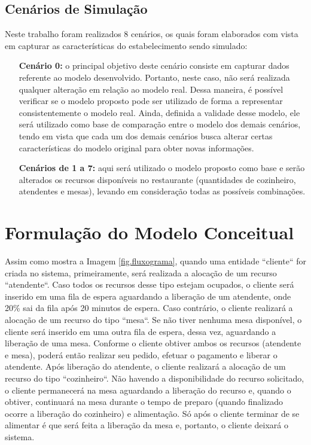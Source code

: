 \documentclass[pt,disc,oneside]{ufscpgeasthesis}
\begin{document}
            \subsection{Cenários de Simulação}
            \label{subsec:cenarios}

                Neste trabalho foram realizados 8 cenários, os quais foram elaborados com vista em capturar as características do estabelecimento sendo simulado:

                \begin{itemize}
                    \item[\textbf{Cenário 0:}] o principal objetivo deste cenário consiste em capturar dados referente ao modelo desenvolvido.
                    Portanto, neste caso, não será realizada qualquer alteração em relação ao modelo real.
                    Dessa maneira, é possível verificar se o modelo proposto pode ser utilizado de forma a representar consistentemente o modelo real.
                    Ainda, definida a validade desse modelo, ele será utilizado como base de comparação entre o modelo dos demais cenários, tendo em vista que cada um dos demais cenários busca alterar certas características do modelo original para obter novas informações.
                    \item[\textbf{Cenários de 1 a 7:}] aqui será utilizado o modelo proposto como base e serão alterados os recursos disponíveis no restaurante (quantidades de cozinheiro, atendentes e mesas), levando em consideração todas as possíveis combinações.
                \end{itemize}

        \section{Formulação do Modelo Conceitual}
		\label{sec:formulacao}

			Assim como mostra a Imagem \ref{fig.fluxograma}, quando uma entidade ``cliente`` for criada no sistema, primeiramente, será realizada a alocação de um recurso ``atendente``.
			Caso todos os recursos desse tipo estejam ocupados, o cliente será inserido em uma fila de espera aguardando a liberação de um atendente, onde 20\% sai da fila após 20 minutos de espera.
			Caso contrário, o cliente realizará a alocação de um recurso do tipo ``mesa``.
			Se não tiver nenhuma mesa disponível, o cliente será inserido em uma outra fila de espera, dessa vez, aguardando a liberação de uma mesa.
			Conforme o cliente obtiver ambos os recursos (atendente e mesa), poderá então realizar seu pedido, efetuar o pagamento e liberar o atendente.
			Após liberação do atendente, o cliente realizará a alocação de um recurso do tipo ``cozinheiro``.
			Não havendo a disponibilidade do recurso solicitado, o cliente permanecerá na mesa aguardando a liberação do recurso e, quando o obtiver, continuará na mesa durante o tempo de preparo (quando finalizado ocorre a liberação do cozinheiro) e alimentação.
			Só após o cliente terminar de se alimentar é que será feita a liberação da mesa e, portanto, o cliente deixará o sistema.
\end{document}
